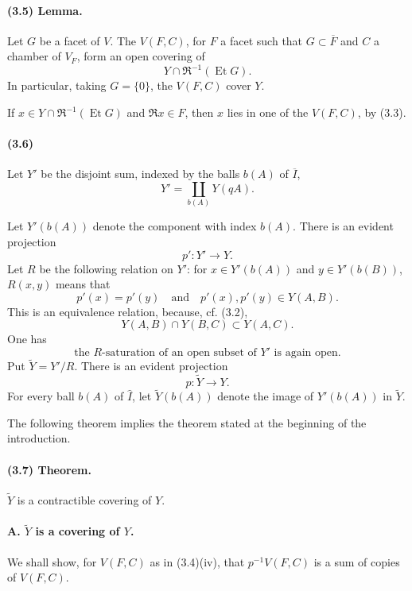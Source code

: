 \documentclass[10pt]{article}
\begin{document}
\paragraph{(3.5) Lemma.} Let \(G\) be a facet of \(V\). The \(V(F,C)\), for \(F\) a facet such that \(G\subset\overline F\) and \(C\) a chamber of \(V_F\), form an open covering of
\[
Y\cap \Re^{-1}(\operatorname{Et}G).
\]
In particular, taking \(G=\{0\}\), the \(V(F,C)\) cover \(Y\).

If \(x\in Y\cap\Re^{-1}(\operatorname{Et}G)\) and \(\Re x\in F\), then \(x\) lies in one of the \(V(F,C)\), by (3.3).

\paragraph{(3.6)} Let \(Y'\) be the disjoint sum, indexed by the balls \(b(A)\) of \(\overline I\),
\[
Y'=\coprod_{b(A)}Y(qA).
\]




Let \(Y'(b(A))\) denote the component with index \(b(A)\). There is an evident projection
\[
p':Y'\longrightarrow Y.
\]
Let \(R\) be the following relation on \(Y'\): for \(x\in Y'(b(A))\) and \(y\in Y'(b(B))\), \(R(x,y)\) means that
\[
p'(x)=p'(y)\quad\text{and}\quad p'(x),p'(y)\in Y(A,B).
\]
This is an equivalence relation, because, cf. (3.2),
\[
Y(A,B)\cap Y(B,C)\subset Y(A,C).
\]
One has
\[
\tag{3.6.1}
\text{the }R\text{-saturation of an open subset of }Y'\text{ is again open.}
\]
Put \(\widetilde Y=Y'/R\). There is an evident projection
\[
p:\widetilde Y\longrightarrow Y.
\]
For every ball \(b(A)\) of \(\widehat I\), let \(\widetilde Y(b(A))\) denote the image of \(Y'(b(A))\) in \(\widetilde Y\).

The following theorem implies the theorem stated at the beginning of the introduction.

\paragraph{(3.7) Theorem.} \(\widetilde Y\) is a contractible covering of \(Y\).

\paragraph{A. \(\widetilde Y\) is a covering of \(Y\).} We shall show, for \(V(F,C)\) as in (3.4)(iv), that \(p^{-1}V(F,C)\) is a sum of copies of \(V(F,C)\).
\end{document}
